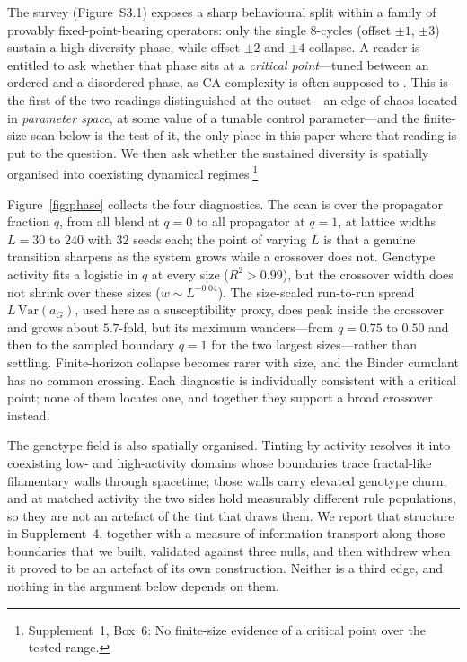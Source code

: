 \documentclass[man,12pt,floatsintext,donotrepeattitle]{apa7}
\newcommand{\suppfindingref}[1]{Supplement~1, Box~#1}
\newcommand{\suppfindingtext}[2]{\suppfindingref{#1}: #2.}
\newcommand{\suppfinding}[2]{\footnote{\suppfindingtext{#1}{#2}}}
\begin{document}
The survey (Figure~S3.1) exposes a sharp behavioural split within a
family of provably fixed-point-bearing operators: only the single 8-cycles
(offset $\pm 1$, $\pm 3$) sustain a high-diversity phase, while offset $\pm 2$ and
$\pm 4$ collapse. A reader is entitled to ask whether that phase sits at a
\emph{critical point}---tuned between an ordered and a disordered phase, as CA
complexity is often supposed to \parencite{langton1990computation}. This is the
first of the two readings distinguished at the outset---an edge of chaos located
in \emph{parameter space}, at some value of a tunable control parameter---and
the finite-size scan below is the test of it, the only place in this paper where
that reading is put to the question. We then ask
whether the sustained diversity is spatially organised into coexisting
dynamical regimes.\suppfinding{6}{No finite-size evidence of a critical point over the tested range}

Figure~\ref{fig:phase} collects the four diagnostics. The scan is over the
propagator fraction $q$, from all blend at $q=0$ to all propagator at $q=1$, at
lattice widths $L = 30$ to $240$ with $32$ seeds each; the point of varying $L$
is that a genuine transition sharpens as the system grows while a crossover does
not. Genotype activity fits a logistic in $q$ at every size ($R^2 > 0.99$), but
the crossover width does not shrink over these sizes ($w \sim L^{-0.04}$). The
size-scaled run-to-run spread $L\,\mathrm{Var}(a_G)$, used here as a
susceptibility proxy, does peak inside the crossover and grows about $5.7$-fold, but
its maximum wanders---from $q=0.75$ to $0.50$ and then to the sampled boundary
$q=1$ for the two largest sizes---rather than settling. Finite-horizon collapse
becomes rarer with size, and the Binder cumulant has no common crossing. Each
diagnostic is individually consistent with a critical point; none of them
locates one, and together they support a broad crossover instead.

The genotype field is also spatially organised. Tinting by activity resolves it
into coexisting low- and high-activity domains whose boundaries trace
fractal-like filamentary walls through spacetime; those walls carry elevated
genotype churn, and at matched activity the two sides hold measurably different
rule populations, so they are not an artefact of the tint that draws them. We
report that structure in Supplement~4, together with a measure of
information transport along those boundaries that we built, validated against
three nulls, and then withdrew when it proved to be an artefact of its own
construction. Neither is a third edge, and nothing in the argument below depends
on them.
\end{document}
